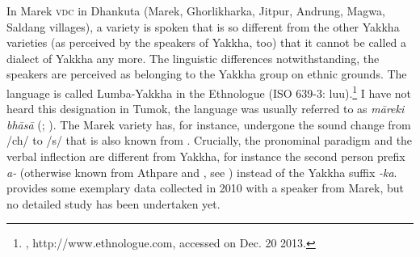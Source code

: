 \begin{table}
\caption{Dialectal variation within the Yakkha region}\label{dialects}
\end{table}



In Marek \textsc{vdc} in Dhankuta (Marek, Ghorlikharka, Jitpur, Andrung, Magwa, Saldang villages),  a variety is spoken that is so different from the other Yakkha varieties (as perceived by  the speakers of Yakkha, too) that it cannot be called a dialect of Yakkha any more. The linguistic differences notwithstanding, the speakers are perceived as belonging to the Yakkha group on ethnic grounds. The language is called Lumba-Yakkha in the Ethnologue (ISO 639-3: luu).\footnote{\citet{Levisetal2015_Ethnologue}, http://www.ethnologue.com, accessed on Dec. 20 2013.} I have not heard this designation in Tumok, the language was usually referred to as \emph{māreki bhāsā} (; ). The Marek variety has, for instance, undergone the sound change from /ch/ to /s/ that is also known from . Crucially, the pronominal paradigm and the verbal inflection are different from Yakkha, for instance the second person prefix \emph{a-}  (otherwise known from Athpare and , see \citealt{Ebert1997A-grammar, Bickeletal2007Free}) instead of the Yakkha suffix \emph{-ka}.  provides some exemplary data collected in 2010 with a speaker from Marek, but no detailed study has been undertaken yet. 

